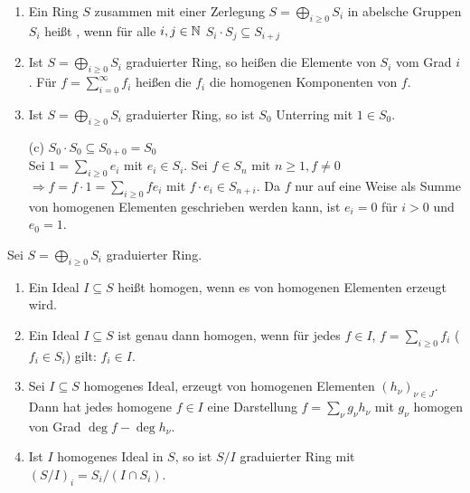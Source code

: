 \documentclass[a4paper, 10pt]{report}
\begin{document}
\begin{DefBem}
\label{2.13}

\begin{enumerate}

\item Ein Ring $S$ zusammen mit einer Zerlegung $S=\bigoplus_{i\geq 0}S_i$
in abelsche Gruppen $S_i$ hei\ss t , wenn f\"ur alle $i, j\in \mathbb{N}$
$S_i\cdot S_j\subseteq S_{i+j}$

\item Ist $S=\bigoplus_{i\geq 0} S_i$ graduierter Ring, so hei\ss en die Elemente
von $S_i$  vom Grad $i$.
F\"ur $f=\sum_{i=0}^{\infty} f_i$ hei\ss en die $f_i$ die homogenen Komponenten von $f$.

\item Ist $S=\bigoplus_{i\geq 0} S_i$ graduierter Ring, so ist $S_0$ Unterring mit $1\in S_0$.
\end{enumerate}

\end{DefBem}

\begin{Bew}
\begin{enumerate}
\item[(c)] $S_0\cdot S_0\subseteq S_{0+0}=S_0$\\
Sei $1=\sum_{i\geq 0}e_i$ mit $e_i\in S_i$. Sei $f\in S_n$ mit $n\geq 1, f\neq 0$
$\Rightarrow f=f\cdot 1 = \sum_{i\geq 0}fe_i$ mit $f\cdot e_i\in S_{n+i}$.
Da $f$ nur auf eine Weise als Summe von homogenen Elementen geschrieben werden
kann, ist $e_i=0$ f\"ur $i> 0$ und $e_0=1$.

\end{enumerate}
\end{Bew}

\begin{DefBem}
\label{2.14}
Sei $S=\bigoplus_{i\geq 0} S_i$ graduierter Ring.
\begin{enumerate}
\item Ein Ideal $I\subseteq S$ hei\ss t homogen, wenn es von homogenen Elementen erzeugt wird.
\item\label{2.14b} Ein Ideal $I\subseteq S$ ist genau dann homogen, wenn
f\"ur jedes $f\in I$, $f=\sum_{i\geq 0} f_i$ ($f_i\in S_i$) gilt: $f_i\in I$.

\item Sei $I\subseteq S$ homogenes Ideal, erzeugt von homogenen Elementen $(h_\nu)_{\nu\in J}$.
Dann hat jedes homogene $f\in I$ eine Darstellung $f=\sum_{\nu}g_\nu h_\nu$ mit $g_\nu$ 
homogen von Grad $\deg f - \deg{h_\nu}$.

\item Ist $I$ homogenes Ideal in $S$, so ist $S/I$ graduierter Ring mit
$(S/I)_i=S_i/(I\cap S_i)$.

\end{enumerate}
\end{DefBem}
\end{document}
